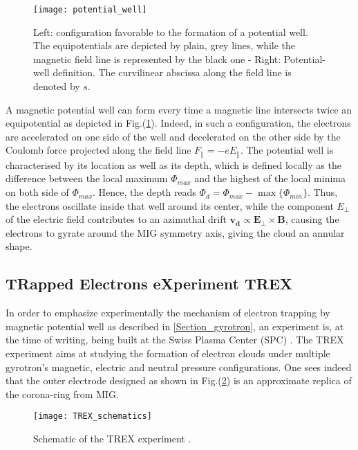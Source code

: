 \begin{figure}[h!]
\centering
	\texttt{[image: potential\_well]}
	\caption{\label{mag_well} Left: configuration favorable to the formation of a potential well. The equipotentials are depicted by plain, grey lines, while the magnetic field line is represented by the black one \cite{Pagonakis} - Right: Potential-well definition. The curvilinear abscissa along the field line is denoted by $s$.}
\end{figure} 


A magnetic potential well can form every time a magnetic line intersects twice an equipotential as depicted in Fig.(\ref{mag_well}). Indeed, in such a configuration, the electrons are accelerated on one side of the well and decelerated on the other side by the Coulomb force projected along the field line $F_{\|} = -eE_{\|}$. The potential well is characterised by its location as well as its depth, which is defined locally as the difference between the local maximum $\Phi_{max}$ and the highest of the local minima on both side of $\Phi_{max}$. Hence, the depth reads $\Phi_d = \Phi_{max} - \max{\{\Phi_{min}\}}$. Thus, the electrons oscillate inside that well around its center, while the component $E_{\perp}$ of the electric field contributes to an azimuthal drift $\mathbf{v_d} \propto \mathbf{E}_{\perp} \times \mathbf{B}$, causing the electrons to gyrate around the MIG symmetry axis, giving the cloud an annular shape.\\

\subsection{TRapped Electrons eXperiment TREX}\label{TREX_Section}

In order to emphasize experimentally the mechanism of electron trapping by magnetic potential well as described in \ref{Section_gyrotron}, an experiment is, at the time of writing, being built at the Swiss Plasma Center (SPC) \cite{TREX}. The TREX experiment aims at studying the formation of electron clouds under multiple gyrotron's magnetic, electric and neutral pressure configurations. One sees indeed that the outer electrode designed as shown in Fig.(\ref{TREX_schematics}) is an approximate replica of the corona-ring from MIG. 

\begin{figure}[h!]
\centering
	\texttt{[image: TREX\_schematics]}
	\caption{\label{TREX_schematics} Schematic of the TREX experiment \cite{TREX}.}
\end{figure}  

